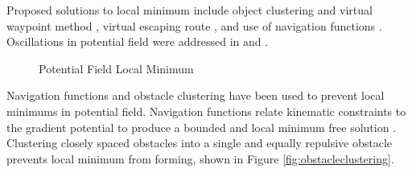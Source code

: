 \documentclass[numbered,pdftex]{ohio-etd}
\begin{document}
Proposed solutions to local minimum include object clustering and virtual waypoint method \cite{liu_virtual-waypoint_2016}, virtual escaping route \cite{kim_escaping_2009}, and use of navigation functions \cite{goerzen_survey_2010}. Oscillations in potential field were addressed in \cite{lei_tang_novel_2010} and \cite{li_efficient_2012}.

\begin{figure}[H]
	\begin{subfigmatrix}{2}%
		\centering
	\end{subfigmatrix}
	\caption{Potential Field Local Minimum \cite{liu_virtual-waypoint_2016}}
	\label{fig:vff}
\end{figure}

Navigation functions \cite{goerzen_survey_2010} and obstacle clustering \cite{liu_virtual-waypoint_2016} have been used to prevent local minimums in potential field. Navigation functions relate kinematic constraints to the gradient potential to produce a bounded and local minimum free solution \cite{rimon_exact_1992}. Clustering closely spaced obstacles into a single and equally repulsive obstacle prevents local minimum from forming, shown in Figure \ref{fig:obstacleclustering}.  
\end{document}
